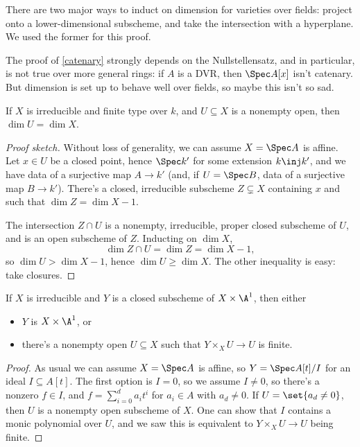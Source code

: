 There are two major ways to induct on dimension for varieties over fields: project onto a lower-dimensional
subscheme, and take the intersection with a hyperplane. We used the former for this proof.
\begin{rem}
The proof of \cref{catenary} strongly depends on the Nullstellensatz, and in particular, is not true over more
general rings: if $A$ is a DVR, then $\Spec A[x]$ isn't catenary. But dimension is set up to behave well over
fields, so maybe this isn't so sad.
\end{rem}
\begin{cor}
If $X$ is irreducible and finite type over $k$, and $U\subseteq X$ is a nonempty open, then $\dim U = \dim X$.
\end{cor}
\begin{proof}[Proof sketch]
Without loss of generality, we can assume $X = \Spec A$ is affine. Let $x \in U$ be a closed point, hence $\Spec
k'$ for some extension $k\inj k'$, and we have data of a surjective map $A\to k'$ (and, if $U = \Spec B$, data of a
surjective map $B\to k'$). There's a closed, irreducible subscheme $Z\subsetneq X$ containing $x$ and such that
$\dim Z = \dim X - 1$.

The intersection $Z\cap U$ is a nonempty, irreducible, proper closed subscheme of $U$, and is an open subscheme of
$Z$. Inducting on $\dim X$,
\begin{equation}
	\dim Z\cap U = \dim Z = \dim X - 1,
\end{equation}
so $\dim U > \dim X - 1$, hence $\dim U\ge\dim X$. The other inequality is easy: take closures.
\end{proof}
\begin{lem}
If $X$ is irreducible and $Y$ is a closed subscheme of $X\times\A^1$, then either
\begin{itemize}
	\item $Y$ is $X\times\A^1$, or
	\item there's a nonempty open $U\subseteq X$ such that $Y\times_X U\to U$ is finite.
\end{itemize}
\end{lem}
\begin{proof}
As usual we can assume $X = \Spec A$ is affine, so $Y = \Spec A[t]/I$ for an ideal $I\subseteq A[t]$. The first
option is $I = 0$, so we assume $I \ne 0$, so there's a nonzero $f\in I$, and $f = \sum_{i=0}^d a_it^i$ for $a_i\in
A$ with $a_d\ne 0$. If $U = \set{a_d\ne 0}$, then $U$ is a nonempty open subscheme of $X$. One can show that $I$
contains a monic polynomial over $U$, and we saw this is equivalent to $Y\times_X U\to U$ being finite.
\end{proof}
